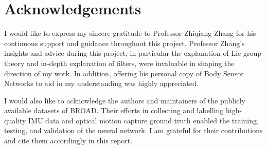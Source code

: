 \section*{Acknowledgements}
I would like to express my sincere gratitude to Professor Zhiqiang Zhang for his continuous 
support and guidance throughout this project. Professor Zhang's insights and advice during 
this project, in particular the explanation of Lie group theory and in-depth explanation of filters, 
were invaluable in shaping the direction of my work. In addition, offering his personal
copy of Body Sensor Networks to aid in my understanding was highly appreciated.

I would also like to acknowledge the authors and maintainers of the publicly available
datasets of BROAD. Their efforts in collecting and labelling high-quality
IMU data and optical motion capture ground truth enabled the training, testing, and 
validation of the neural network. I am grateful for their contributions and cite them
accordingly in this report.  
